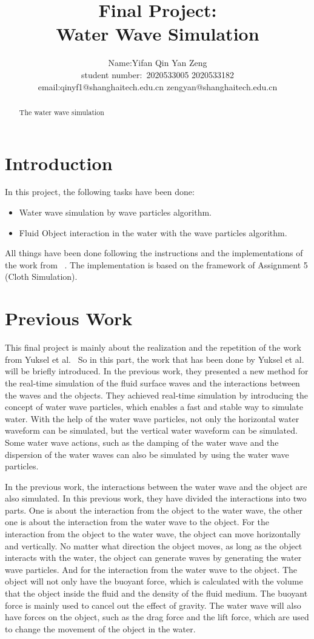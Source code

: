 \documentclass[acmtog]{acmart}
\title{Final Project:\\ {Water Wave Simulation}}
\author{Name:\quad Yifan Qin Yan Zeng \\ student number:\ 2020533005 2020533182
\\email:\quad qinyf1@shanghaitech.edu.cn zengyan@shanghaitech.edu.cn}
\begin{document}
\maketitle
\begin{abstract}
The water wave simulation 
\end{abstract}

\vspace*{2 ex}

\section{Introduction}
In this project, the following tasks have been done:
\begin{itemize}
    \item Water wave simulation by wave particles algorithm.
    \item Fluid Object interaction in the water with the wave particles algorithm.
\end{itemize}
All things have been done following the instructions and the implementations of the work from ~\cite{yuksel2007wave}. 
The implementation is based on the framework of Assignment 5 (Cloth Simulation).

\section{Previous Work}
This final project is mainly about the realization and the repetition of the work from Yuksel et al.~\cite{yuksel2007wave} 
So in this part, the work that has been done by Yuksel et al. will be briefly introduced. 
In the previous work, they presented a new method for the real-time simulation of the fluid surface waves and the interactions between the waves and the objects. 
They achieved real-time simulation by introducing the concept of water wave particles, which enables a fast and stable way to simulate water. 
With the help of the water wave particles, not only the horizontal water waveform can be simulated, but the vertical water waveform can be simulated. 
Some water wave actions, such as the damping of the water wave and the dispersion of the water waves can also be simulated by using the water wave particles. 

In the previous work, the interactions between the water wave and the object are also simulated. 
In this previous work, they have divided the interactions into two parts. 
One is about the interaction from the object to the water wave, the other one is about the interaction from the water wave to the object. 
For the interaction from the object to the water wave, the object can move horizontally and vertically. 
No matter what direction the object moves, as long as the object interacts with the water, the object can generate waves by generating the water wave particles. 
And for the interaction from the water wave to the object. 
The object will not only have the buoyant force, which is calculated with the volume that the object inside the fluid and the density of the fluid medium. 
The buoyant force is mainly used to cancel out the effect of gravity. 
The water wave will also have forces on the object, such as the drag force and the lift force, which are used to change the movement of the object in the water. 
\end{document}
